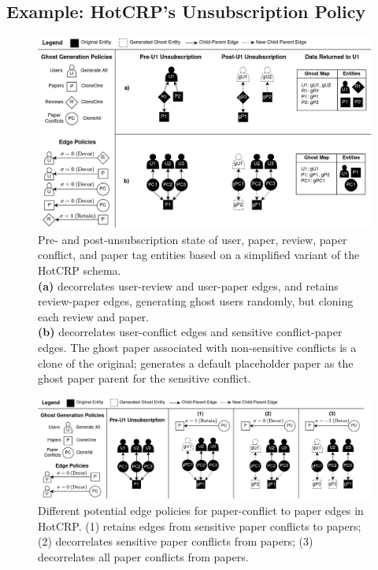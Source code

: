 \subsection{Example: HotCRP's Unsubscription Policy}
\label{sec:hotcrp_example}
\begin{figure}[t!]
    \centering
    \includegraphics[width=\textwidth]{img/decor_hotcrp}

    \caption{Pre- and post-unsubscription state of user, paper, review, paper conflict, and paper
    tag entities based on a simplified variant of the HotCRP schema. \\ 
    \textbf{(a)} \sys decorrelates user-review and user-paper edges, and retains
    review-paper edges, generating ghost users randomly, but cloning each review and paper. \\
    \textbf{(b)} \sys decorrelates user-conflict edges and sensitive conflict-paper edges. The ghost
    paper associated with non-sensitive conflicts is a clone of the original; \sys generates a
    default placeholder paper as the ghost paper parent for the sensitive conflict.
    }
    \label{fig:hotcrp}
\end{figure}

\begin{figure}[ht!]
    \centering
    \includegraphics[width=\textwidth]{img/pcs}

    \caption{Different potential edge policies for paper-conflict to paper edges in HotCRP.
    (1) retains edges from sensitive paper conflicts to papers; (2) decorrelates sensitive
    paper conflicts from papers; (3) decorrelates all paper conflicts from papers.}
    \label{fig:pcs}
\end{figure}

